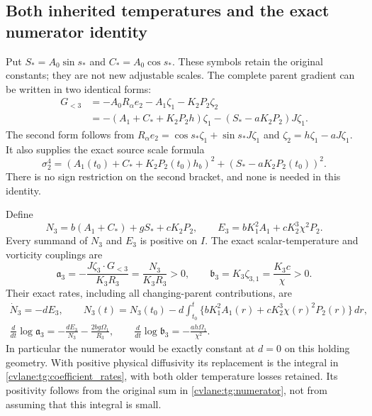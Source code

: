 \subsection{Both inherited temperatures and the exact numerator identity}

Put $S_*=A_0\sin s_*$ and $C_*=A_0\cos s_*$. These symbols
retain the original constants; they are not new adjustable scales.
The complete parent gradient can be written in two identical forms:
\begin{equation}\label{cvlane:tg:gradient}
\begin{aligned}
 G_{<3}&=-A_0R_\alpha e_2-A_1\zeta_1-K_2P_2\zeta_2\\
       &=-(A_1+C_*+K_2P_2h)\zeta_1
                   -(S_*-aK_2P_2)J\zeta_1.
\end{aligned}
\end{equation}
The second form follows from
$R_\alpha e_2=\cos s_*\zeta_1+\sin s_*J\zeta_1$ and
$\zeta_2=h\zeta_1-aJ\zeta_1$. It also supplies the exact
source scale formula
\begin{equation}\label{cvlane:tg:scale}
 \sigma_2^4=
  (A_1(t_0)+C_*+K_2P_2(t_0)h_b)^2
  +(S_*-aK_2P_2(t_0))^2.
\end{equation}
There is no sign restriction on the second bracket, and none is
needed in this identity.

Define
\begin{equation}\label{cvlane:tg:numerator}
 N_3=b(A_1+C_*)+gS_*+cK_2P_2,\qquad
 E_3=bK_1^2A_1+cK_2^3\chi^2P_2.
\end{equation}
Every summand of $N_3$ and $E_3$ is positive on $I$.
The exact scalar-temperature and vorticity couplings are
\begin{equation}\label{cvlane:tg:couplings}
 \mathfrak a_3=-\frac{J\zeta_3\cdot G_{<3}}{K_3R_3}
              =\frac{N_3}{K_3R_3}>0,
 \qquad
 \mathfrak b_3=K_3\zeta_{3,1}=\frac{K_3c}{\chi}>0.
\end{equation}
Their exact rates, including all changing-parent contributions, are
\begin{equation}\label{cvlane:tg:coefficient_rates}
\begin{gathered}
 \dot N_3=-dE_3,\qquad
 N_3(t)=N_3(t_0)-d\int_{t_0}^t
       \{bK_1^2A_1(r)+cK_2^3\chi(r)^2P_2(r)\}\,dr,\\
 \frac{d}{dt}\log\mathfrak a_3
       =-\frac{dE_3}{N_3}-\frac{2bg\Omega_1}{R_3},\qquad
 \frac{d}{dt}\log\mathfrak b_3
       =-\frac{ah\Omega_1}{\chi^2}.
\end{gathered}
\end{equation}
In particular the numerator would be exactly constant at $d=0$
on this holding geometry. With positive physical diffusivity its
replacement is the integral in \eqref{cvlane:tg:coefficient_rates}, with
both older temperature losses retained. Its positivity follows from
the original sum in \eqref{cvlane:tg:numerator}, not from assuming that this
integral is small.

